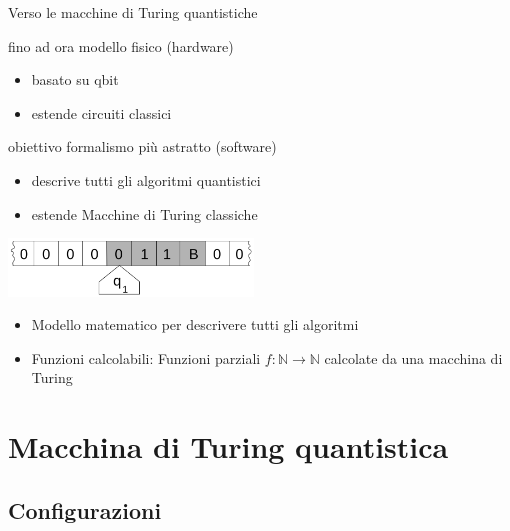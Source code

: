\documentclass{beamer}
\begin{document}
\begin{frame}{Verso le macchine di Turing quantistiche}
	\begin{block}{fino ad ora}
		modello fisico (hardware)
		\begin{itemize}
			\item basato su qbit
			\item estende circuiti classici
		\end{itemize}
	\end{block}

	\pause \vspace{2ex}

	\begin{block}{obiettivo}
		formalismo più astratto (software)
		\begin{itemize}
			\item descrive tutti gli algoritmi quantistici
			\item estende Macchine di Turing classiche
		\end{itemize}
	\end{block}
\end{frame}

\begin{frame}{\subsecname}{}
	\centering\includegraphics[width=6.5cm]{Turing_machine_2b.png}
	\begin{itemize}
		\item<+-> Modello matematico per descrivere tutti gli algoritmi
		\item<+-> \alert{Funzioni calcolabili}: Funzioni parziali \( f : \mathbb{N} \rightarrow \mathbb{N} \) calcolate da una macchina di Turing
	\end{itemize}
\end{frame}

\section{Macchina di Turing quantistica}

\subsection{Configurazioni}
\end{document}
